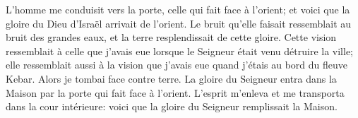 L’homme me conduisit vers la porte, celle qui fait face à l’orient;
	et voici que la gloire du Dieu d’Israël arrivait de l’orient.
Le bruit qu’elle faisait ressemblait au bruit des grandes eaux,
	et la terre resplendissait de cette gloire. 
Cette vision ressemblait à celle que j’avais eue
		lorsque le Seigneur était venu détruire la ville;
	elle ressemblait aussi à la vision que j’avais eue
		quand j’étais au bord du fleuve Kebar.
Alors je tombai face contre terre.
La gloire du Seigneur entra dans la Maison par la porte qui fait face à l’orient.
L’esprit m’enleva et me transporta dans la cour intérieure:
	voici que la gloire du Seigneur remplissait la Maison.
